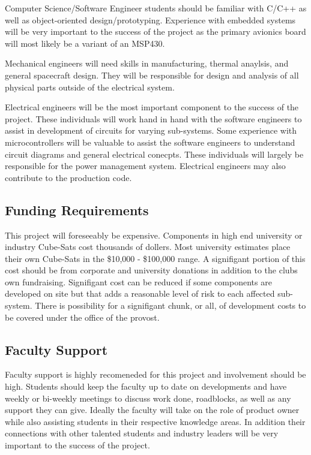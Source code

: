\documentclass[conference]{IEEEtran} %
\begin{document}
Computer Science/Software Engineer students should be familiar with C/C++ as well as object-oriented design/prototyping.  Experience with embedded systems will be very important to the success of the project as the primary avionics board will most likely be a variant of an MSP430.  

Mechanical engineers will need skills in manufacturing, thermal anaylsis, and general spacecraft design.  They will be responsible for design and analysis of all physical parts outside of the electrical system.

Electrical engineers will be the most important component to the success of the project.  These individuals will work hand in hand with the software engineers to assist in development of circuits for varying sub-systems.  Some experience with microcontrollers will be valuable to assist the software engineers to understand circuit diagrams and general electrical conecpts.  These individuals will largely be responsible for the power management system.  Electrical engineers may also contribute to the production code.


\subsection{Funding Requirements}

This project will foreseeably be expensive.  Components in high end university or industry Cube-Sats cost thousands of dollers.  Most university estimates place their own Cube-Sats in the \$10,000 - \$100,000 range.  A signifigant portion of this cost should be from corporate and university donations in addition to the clubs own fundraising.  Signifigant cost can be reduced if some components are developed on site but that adds a reasonable level of risk to each affected sub-system.  There is possibility for a signifigant chunk, or all, of development costs to be covered under the office of the provost.

\subsection{Faculty Support}
Faculty support is highly recomeneded for this project and involvement should be high.  Students should keep the faculty up to date on developments and have weekly or bi-weekly meetings to discuss work done, roadblocks, as well as any support they can give.  Ideally the faculty will take on the role of product owner while also assisting students in their respective knowledge areas.  In addition their connections with other talented students and industry leaders will be very important to the success of the project.
\end{document}
